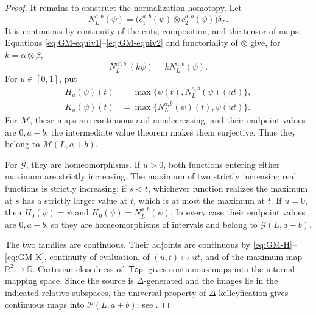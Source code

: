 \documentclass[12pt,a4paper]{amsart}
\newcommand{\Top}{\mathop{\mathsf{Top}}}
\newcommand{\Pcat}{\mathcal P}
\newcommand{\G}{\mathcal G}
\newcommand{\M}{\mathcal M}
\theoremstyle{definition}
\begin{document}
\begin{proof}
It remains to construct the normalization homotopy.  Let
\begin{equation}\label{eq:GM-N}
 N^{a,b}_L(\psi)=
 \bigl(c^{a,b}_1(\psi)\otimes c^{a,b}_2(\psi)\bigr)\delta_L.
\end{equation}
It is continuous by continuity of the cuts, composition, and the tensor of maps.  Equations \eqref{eq:GM-equiv1}--\eqref{eq:GM-equiv2} and functoriality of \(\otimes\) give, for \(k=\alpha\otimes\beta\),
\begin{equation}\label{eq:GM-N-equiv}
 N^{a',b'}_L(k\psi)=kN^{a,b}_L(\psi).
\end{equation}
For \(u\in[0,1]\), put
\begin{align}
 H_u(\psi)(t)
  &=\max\{\psi(t),N^{a,b}_L(\psi)(ut)\},             \label{eq:GM-H}\\
 K_u(\psi)(t)
  &=\max\{N^{a,b}_L(\psi)(t),\psi(ut)\}.            \label{eq:GM-K}
\end{align}
For \(\M\), these maps are continuous and nondecreasing, and their endpoint values are \(0,a+b\); the intermediate value theorem makes them surjective. Thus they belong to \(\M(L,a+b)\).

For \(\G\), they are homeomorphisms.  If \(u>0\), both functions entering either maximum are strictly increasing.  The maximum of two strictly increasing real functions is strictly increasing: if \(s<t\), whichever function realizes the maximum at \(s\) has a strictly larger value at \(t\), which is at most the maximum at \(t\).  If \(u=0\), then \(H_0(\psi)=\psi\) and \(K_0(\psi)=N^{a,b}_L(\psi)\).  In every case their endpoint values are \(0,a+b\), so they are homeomorphisms of intervals and belong to \(\G(L,a+b)\).

The two families are continuous.  Their adjoints are continuous by \eqref{eq:GM-H}--\eqref{eq:GM-K}, continuity of evaluation, of \((u,t)\mapsto ut\), and of the maximum map \(\mathbb R^2\to\mathbb R\). Cartesian closedness of \(\Top\) gives continuous maps into the internal mapping space.  Since the source is \(\Delta\)-generated and the images lie in the indicated relative subspaces, the universal property of \(\Delta\)-kelleyfication gives continuous maps into \(\Pcat(L,a+b)\); see \cite[Section~2]{Moore1}.


\end{proof}
\end{document}
